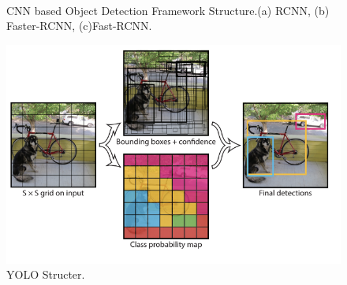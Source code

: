 \begin{figure}
{}\\
\caption{CNN based Object Detection Framework Structure.(a) RCNN, (b) Faster-RCNN, (c)Fast-RCNN.}
 \label{fig:cnn}
\end{figure}

\begin{figure}
\centering
 \includegraphics[width=0.8\linewidth]{Figures/yolo.png}
 \caption{YOLO Structer.}
 \label{fig:yolo}
\end{figure}

